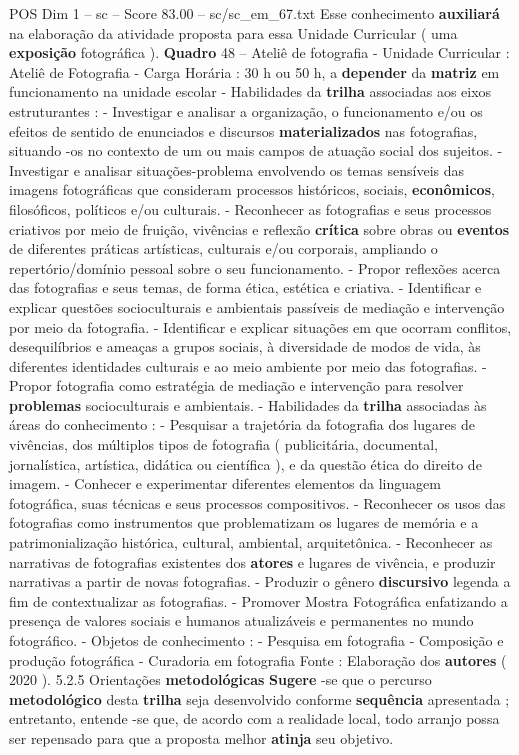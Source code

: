\begin{textsample}{POS Dim 1 – sc – Score 83.00 – sc/sc\_em\_67.txt}
Esse conhecimento \textbf{auxiliará} na elaboração da atividade proposta para essa Unidade Curricular ( uma \textbf{exposição} fotográfica ). \textbf{Quadro} 48 – Ateliê de fotografia - Unidade Curricular : Ateliê de Fotografia - Carga Horária : 30 h ou 50 h, a \textbf{depender} da \textbf{matriz} em funcionamento na unidade escolar - Habilidades da \textbf{trilha} associadas aos eixos estruturantes : - Investigar e analisar a organização, o funcionamento e/ou os efeitos de sentido de enunciados e discursos \textbf{materializados} nas fotografias, situando -os no contexto de um ou mais campos de atuação social dos sujeitos. - Investigar e analisar situações-problema envolvendo os temas sensíveis das imagens fotográficas que consideram processos históricos, sociais, \textbf{econômicos}, filosóficos, políticos e/ou culturais. - Reconhecer as fotografias e seus processos criativos por meio de fruição, vivências e reflexão \textbf{crítica} sobre obras ou \textbf{eventos} de diferentes práticas artísticas, culturais e/ou corporais, ampliando o repertório/domínio pessoal sobre o seu funcionamento. - Propor reflexões acerca das fotografias e seus temas, de forma ética, estética e criativa. - Identificar e explicar questões socioculturais e ambientais passíveis de mediação e intervenção por meio da fotografia. - Identificar e explicar situações em que ocorram conflitos, desequilíbrios e ameaças a grupos sociais, à diversidade de modos de vida, às diferentes identidades culturais e ao meio ambiente por meio das fotografias. - Propor fotografia como estratégia de mediação e intervenção para resolver \textbf{problemas} socioculturais e ambientais. - Habilidades da \textbf{trilha} associadas às áreas do conhecimento : - Pesquisar a trajetória da fotografia dos lugares de vivências, dos múltiplos tipos de fotografia ( publicitária, documental, jornalística, artística, didática ou científica ), e da questão ética do direito de imagem. - Conhecer e experimentar diferentes elementos da linguagem fotográfica, suas técnicas e seus processos compositivos. - Reconhecer os usos das fotografias como instrumentos que problematizam os lugares de memória e a patrimonialização histórica, cultural, ambiental, arquitetônica. - Reconhecer as narrativas de fotografias existentes dos \textbf{atores} e lugares de vivência, e produzir narrativas a partir de novas fotografias. - Produzir o gênero \textbf{discursivo} legenda a fim de contextualizar as fotografias. - Promover Mostra Fotográfica enfatizando a presença de valores sociais e humanos atualizáveis e permanentes no mundo fotográfico. - Objetos de conhecimento : - Pesquisa em fotografia - Composição e produção fotográfica - Curadoria em fotografia Fonte : Elaboração dos \textbf{autores} ( 2020 ). 5.2.5 Orientações \textbf{metodológicas} \textbf{Sugere} -se que o percurso \textbf{metodológico} desta \textbf{trilha} seja desenvolvido conforme \textbf{sequência} apresentada ; entretanto, entende -se que, de acordo com a realidade local, todo arranjo possa ser repensado para que a proposta melhor \textbf{atinja} seu objetivo.

\end{textsample}
